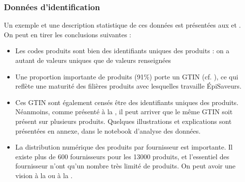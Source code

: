                 \subsubsection{Données d'identification}
                Un exemple et une description statistique de ces données est présentées aux  et .
                On peut en tirer les conclusions suivantes : 
                \begin{itemize}
                    \item Les codes produits sont bien des identifiants uniques des produits : on a autant de valeurs uniques que de valeurs renseignées
                    \item Une proportion importante de produits (91\%) porte un GTIN (cf. \cite{GS1_GTIN}), ce qui reflète une \og maturité \fg des filières produits avec lesquelles travaille \'{E}piSaveurs.
                    \item Ces GTIN sont également censés être des identifiants uniques des produits. Néanmoins, comme présenté à la , il peut arriver que le même GTIN soit présent sur plusieurs produits. Quelques illustrations et explications sont présentées en annexe, dans le notebook d'analyse des données.
                    \item La distribution numérique des produits par fournisseur est importante. Il existe plus de 600 fournisseurs pour les 13000 produits, et l'essentiel des fournisseur n'ont qu'un nombre très limité de produits. On peut avoir une vision à la  ou à la .
                \end{itemize}

                \begin{figure}[htbp]\CenterFloatBoxes
                    \begin{floatrow}
                    \end{floatrow}
                \end{figure}        


